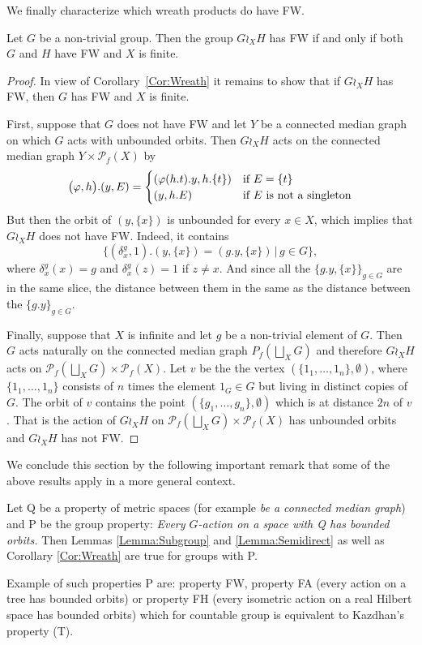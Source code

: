 We finally characterize which wreath products do have FW.
\begin{prop}\label{Prop:Median}
Let $G$ be a non-trivial group.
Then the group $G\wr_X H$ has FW if and only if both $G$ and $H$ have FW and $X$ is finite.
\end{prop}
\begin{proof}
In view of Corollary~\ref{Cor:Wreath} it remains to show that if $G\wr_X H$ has FW, then $G$ has FW and $X$ is finite.

First, suppose that $G$ does not have FW and let $Y$ be a connected median graph on which $G$ acts with unbounded orbits.
Then $G\wr_X H$ acts on the connected median graph $Y\times \mathcal P_f(X)$ by
\[
	\bigl(\phi,h\bigr).(y,E)=
	\begin{cases}
	(\phi(h.t).y,h.\{t\})&\textnormal{if $E=\{t\}$}\\
	(y,h.E)&\textnormal{if $E$ is not a singleton}
	\end{cases}
\]
But then the orbit of $(y,\{x\})$ is unbounded for every $x\in X$, which implies that $G\wr_X H$ does not have FW.
Indeed, it contains
\[
	\{(\delta_{x}^g,1).(y,\{x\})=(g.y,\{x\})\,|\,g\in G\},
\]
where $\delta_{x}^g(x)=g$ and $\delta_{x}^g(z)=1$ if $z\neq x$. 
And since all the $\{g.y,\{x\}\}_{g\in G}$ are in the same slice, the distance between them in the same as the distance between the $\{g.y\}_{g\in G}$.

Finally, suppose that $X$ is infinite and let $g$ be a non-trivial element of $G$.
Then $G$ acts naturally on the connected median graph $P_f(\bigsqcup_XG)$ and therefore $G\wr_X H$ acts on $\mathcal P_f(\bigsqcup_XG)\times \mathcal P_f(X)$.
Let $v$ be the the vertex $(\{1_1,\dots, 1_n\},\emptyset)$, where $\{1_1,\dots, 1_n\}$ consists of $n$ times the element $1_G\in G$ but living in distinct copies of $G$.
The orbit of $v$ contains the point $(\{g_1,\dots, g_n\},\emptyset)$ which is at distance $2n$ of $v$.
That is the action of $G\wr_X H$ on $\mathcal P_f(\bigsqcup_XG)\times \mathcal P_f(X)$ has unbounded orbits and $G\wr_X H$ has not FW.
\end{proof}

We conclude this section by the following important remark that some of the above results apply in a more general context.
\begin{rem}
Let Q be a property of metric spaces (for example \emph{be a connected median graph}) and P be the group property: \emph{Every $G$-action on a space with Q has bounded orbits.}
Then Lemmas \ref{Lemma:Subgroup} and \ref{Lemma:Semidirect} as well as Corollary \ref{Cor:Wreath} are true for groups with P.

Example of such properties P are: property FW, property FA (every action on a tree has bounded orbits) or property FH (every isometric action on a real Hilbert space has bounded orbits) which for countable group is equivalent to Kazdhan's property (T).
\end{rem}

